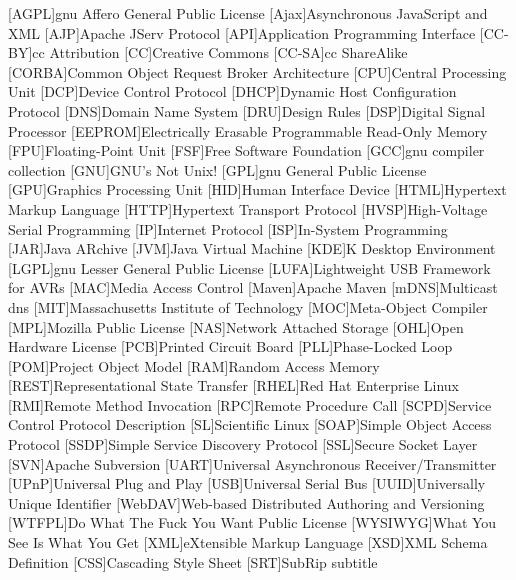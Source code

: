 \begin{acronym}[WYSIWYG]	%
[AGPL]{\acs{gnu} Affero General Public License}
[Ajax]{Asynchronous JavaScript and XML}
[AJP]{Apache JServ Protocol}
[API]{Application Programming Interface}
[CC-BY]{\acl{cc} Attribution}
[CC]{Creative Commons}
[CC-SA]{\acl{cc} ShareAlike}
[CORBA]{Common Object Request Broker Architecture}
[CPU]{Central Processing Unit}
[DCP]{Device Control Protocol}
[DHCP]{Dynamic Host Configuration Protocol}
[DNS]{Domain Name System}
[DRU]{Design Rules}
[DSP]{Digital Signal Processor}
[EEPROM]{Electrically Erasable Programmable Read-Only Memory}
[FPU]{Floating-Point Unit}
[FSF]{Free Software Foundation}
[GCC]{\acs{gnu} compiler collection}
[GNU]{GNU's Not Unix!}
[GPL]{\acs{gnu} General Public License}
[GPU]{Graphics Processing Unit}
[HID]{Human Interface Device}
[HTML]{Hypertext Markup Language}
[HTTP]{Hypertext Transport Protocol}
[HVSP]{High-Voltage Serial Programming}
[IP]{Internet Protocol}
[ISP]{In-System Programming}
[JAR]{Java ARchive}
[JVM]{Java Virtual Machine}
[KDE]{K Desktop Environment}
[LGPL]{\acs{gnu} Lesser General Public License}
[LUFA]{Lightweight USB Framework for AVRs}
[MAC]{Media Access Control}
[Maven]{Apache Maven}
[mDNS]{Multicast \acs{dns}}
[MIT]{Massachusetts Institute of Technology}
[MOC]{Meta-Object Compiler}
[MPL]{Mozilla Public License}
[NAS]{Network Attached Storage}
[OHL]{Open Hardware License}
[PCB]{Printed Circuit Board}
[PLL]{Phase-Locked Loop}
[POM]{Project Object Model}
[RAM]{Random Access Memory}
[REST]{Representational State Transfer}
[RHEL]{Red Hat Enterprise Linux}
[RMI]{Remote Method Invocation}
[RPC]{Remote Procedure Call}
[SCPD]{Service Control Protocol Description}
[SL]{Scientific Linux}
[SOAP]{Simple Object Access Protocol}
[SSDP]{Simple Service Discovery Protocol}
[SSL]{Secure Socket Layer}
[SVN]{Apache Subversion}
[UART]{Universal Asynchronous Receiver/Transmitter}
[UPnP]{Universal Plug and Play}
[USB]{Universal Serial Bus}
[UUID]{Universally Unique Identifier}
[WebDAV]{Web-based Distributed Authoring and Versioning}
[WTFPL]{Do What The Fuck You Want Public License}
[WYSIWYG]{What You See Is What You Get}
[XML]{eXtensible Markup Language}
[XSD]{XML Schema Definition}
[CSS]{Cascading Style Sheet}
[SRT]{SubRip subtitle}
\end{acronym}
